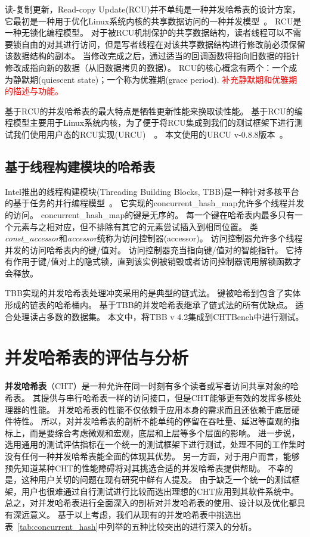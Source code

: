 读-复制更新，Read-copy Update(RCU)并不单纯是一种并发哈希表的设计方案，它最初是一种用于优化Linux系统内核的共享数据访问的一种并发模型~\cite{rcu}。
RCU是一种无锁化编程模型。
对于被RCU机制保护的共享数据结构，读者线程可以不需要锁自由的对其进行访问，但是写者线程在对该共享数据结构进行修改前必须保留该数据结构的副本。
当修改完成之后，通过适当的回调函数将指向旧数据的指针修改成指向新的数据（从旧数据拷贝的数据）。
RCU的核心概念有两个：一个成为静默期(quiescent state)；一个称为优雅期(grace period).
\textcolor{red}{补充静默期和优雅期的描述与功能。}

基于RCU的并发哈希表的最大特点是牺牲更新性能来换取读性能。
基于RCU的编程模型主要用于Linux系统内核，为了便于将RCU集成到我们的测试框架下进行测试我们使用用户态的RCU实现(URCU)~\cite{urcu}~。
本文使用的URCU v-0.8.8版本~\cite{urcucode}。

\subsection{基于线程构建模块的哈希表}

Intel推出的线程构建模块(Threading Building Blocks, TBB)是一种针对多核平台的基于任务的并行编程模型~\cite{tbb}。
它实现的concurrent\_hash\_map允许多个线程并发的访问。
concurrent\_hash\_map的键是无序的。
每一个键在哈希表内最多只有一个元素与之相对应，但不排除有其它的元素尝试插入到相同位置。
类\textit{const\_accessor}和\textit{accessor}统称为访问控制器(accessor)。
访问控制器允许多个线程并发的访问哈希表内的键/值对。
访问控制器充当指向键/值对的智能指针。
它持有作用于键/值对上的隐式锁，直到该实例被销毁或者访问控制器调用解锁函数才会释放。

TBB实现的并发哈希表处理冲突采用的是典型的链式法。
键被哈希到包含了实体形成的链表的哈希桶内。
基于TBB的并发哈希表继承了链式法的所有优缺点。
适合处理读占多数的数据集。
本文中，将TBB v 4.2集成到CHTBench中进行测试。

\section{并发哈希表的评估与分析}
\textbf{并发哈希表}（CHT）是一种允许在同一时刻有多个读者或写者访问共享对象的哈希表。
其提供与串行哈希表一样的访问接口，但是CHT能够更有效的发挥多核处理器的性能。
并发哈希表的性能不仅依赖于应用本身的需求而且还依赖于底层硬件特性。
所以，对并发哈希表的剖析不能单纯的停留在吞吐量、延迟等直观的指标上，而是要综合考虑微观和宏观，底层和上层等多个层面的影响。
进一步说，选用通用的测试评估指标在一个统一的测试框架下进行测试，处理不同的工作集时没有任何一种并发哈希表能全面的体现其优势。
另一方面，对于用户而言，能够预先知道某种CHT的性能障碍将对其挑选合适的并发哈希表提供帮助。
不幸的是，这种用户关切的问题在现有研究中鲜有人提及。
由于缺乏一个统一的测试框架，用户也很难通过自行测试进行比较而选出理想的CHT应用到其软件系统中。
总之，对并发哈希表进行全面深入的剖析对并发哈希表的使用、设计以及优化都具有深远意义。
基于以上考虑，我们从现有的并发哈希表中挑选出表~\ref{tab:concurrent_hash}中列举的五种比较突出的进行深入的分析。

